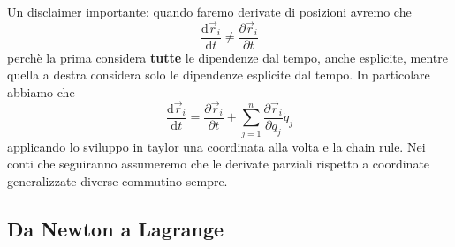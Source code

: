\documentclass[11pt]{scrartcl}
\newcommand{\dif}{\text{d}}
\newcommand{\posit}{\vec{r}}
\begin{document}
	Un disclaimer importante: quando faremo derivate di posizioni avremo che
	$$\frac{\dif\posit_i}{\dif t}\ne\frac{\partial \posit_i}{\partial t}$$
	perchè la prima considera \textbf{tutte} le dipendenze dal tempo, anche esplicite, mentre quella a destra considera solo le dipendenze esplicite dal tempo. In particolare abbiamo che
	$$\frac{\dif \posit_i}{\dif t}=\frac{\partial \posit_i}{\partial t}+\sum_{j=1}^{n}\frac{\partial \posit_i}{\partial q_j}\dot{q}_j$$
	applicando lo sviluppo in taylor una coordinata alla volta e la chain rule. Nei conti che seguiranno assumeremo che le derivate parziali rispetto a coordinate generalizzate diverse commutino sempre.
	
	\subsection{Da Newton a Lagrange}
	
\end{document}
